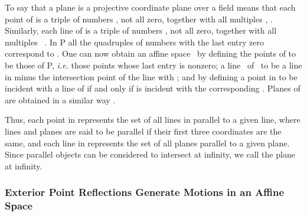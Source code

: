 \documentclass[a4paper,twoside,12pt]{article}
\begin{document}
     To say that a plane \myHighlight{$\Pi$}\coordHE{} is a projective coordinate plane over a field 
\coordHE{} means that each point of \myHighlight{$\Pi$}\coordHE{} is a triple of numbers 
\coordHE{}, not all zero, together with all multiples 
\coordHE{}, \coordHE{}. Similarly,
each line of \myHighlight{$\Pi$}\coordHE{} is a triple of numbers \myHighlight{$[u_{0},u_{1},u_{2}]$}\coordHE{}, not all 
zero, together with all multiples 
\coordHE{}\ \coordHE{}. 
In P\coordHE{} all the quadruples of
numbers with the last entry zero correspond to \myHighlight{$\Pi$}\coordHE{}. One can now obtain an
affine space \coordHE{}\ by defining the points of \coordHE{} to be
those of P\coordHE{}, {\it i.e.} those points whose last entry
is nonzero; a line \coordHE{}\ of \coordHE{}\ to be a line \coordHE{} in 
\coordHE{} minus the intersection point of the line 
\coordHE{} with \myHighlight{$\Pi$}\coordHE{}; and by defining a point \coordHE{} in \coordHE{} to be
incident with a line \coordHE{} of \coordHE{} if and only if \coordHE{} is
incident with the corresponding \coordHE{}. Planes of \coordHE{} are
obtained in a similar way \cite{Cox4}.

   Thus, each point in \myHighlight{$\Pi$}\coordHE{} represents the set of all lines in \coordHE{}
parallel to a given line, where lines and planes are said to be parallel
if their first three coordinates are the same, and each line in \myHighlight{$\Pi$}\coordHE{}
represents the set of all planes parallel to a given plane. Since parallel
objects can be considered to intersect at infinity, we call \myHighlight{$\Pi$}\coordHE{} the
plane at infinity.

\subsubsection{Exterior Point Reflections Generate Motions in an Affine Space}
\end{document}
